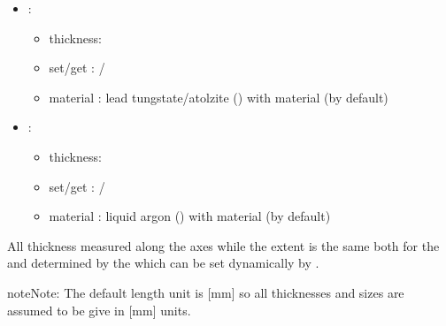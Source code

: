 \documentclass[letterpaper,10pt,english]{sphinxmanual}
\begin{document}
\begin{fulllineitems}
\begin{itemize}
\begin{itemize}
\end{itemize}


\item {} 
\sphinxAtStartPar
{}:\begin{itemize}
\item {} 
\sphinxAtStartPar
thickness: 

\item {} 
\sphinxAtStartPar
set/get : /

\item {} 
\sphinxAtStartPar
material : lead tungstate/atolzite () with material  (by default)

\end{itemize}


\item {} 
\sphinxAtStartPar
{}:\begin{itemize}
\item {} 
\sphinxAtStartPar
thickness: 

\item {} 
\sphinxAtStartPar
set/get : /

\item {} 
\sphinxAtStartPar
material : liquid argon () with material  (by default)

\end{itemize}


\end{itemize}


\sphinxAtStartPar

All thickness measured along the  axes while the  extent is the same both for the  and  determined by the  which can be set dynamically by .
\begin{sphinxadmonition}{note}{Note:}
\sphinxAtStartPar
The default length unit is {[}mm{]} so all thicknesses and sizes are assumed to be give in {[}mm{]} units.
\end{sphinxadmonition}


\end{fulllineitems}
\end{document}
